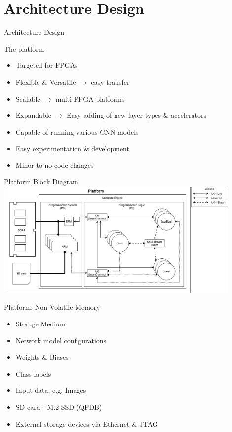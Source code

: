 \setlength{\parskip}{\baselineskip}
\section{Architecture Design}

\begin{frame}
	\huge Architecture Design
\end{frame}

\begin{frame}{The platform}
	\begin{itemize}
		\item Targeted for FPGAs
		\item Flexible \& Versatile $\rightarrow$ easy transfer
		\item Scalable $\rightarrow$ multi-FPGA platforms
		\item Expandable $\rightarrow$ Easy adding of new layer types \& accelerators
		\item Capable of running various CNN models
		\item Easy experimentation \& development
		\item Minor to no code changes
	\end{itemize}
\end{frame}

\begin{frame}{Platform Block Diagram}
	\centering
	\includegraphics[width=0.9\textwidth]{../Images/Platform/platform-legend-right.png}\\
\end{frame}

\begin{frame}{Platform: Non-Volatile Memory}
	\begin{itemize}
		\item Storage Medium
		\item Network model configurations
		\item Weights \& Biases
		\item Class labels
		\item Input data, e.g. Images
		\item SD card - M.2 SSD (QFDB)
		\item External storage devices via Ethernet \& JTAG
	\end{itemize}
\end{frame}

